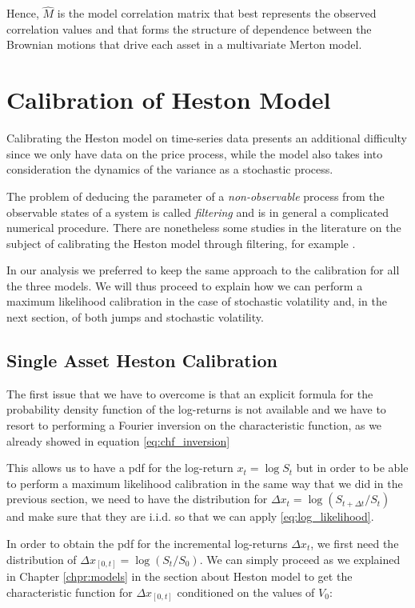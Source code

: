 Hence, $\widehat{M}$ is the model correlation matrix that best represents the observed correlation values and that forms the structure of dependence between the Brownian motions that drive each asset in a multivariate Merton model.


\bigskip
\section{Calibration of Heston Model}
\label{sec:heston_cal}
Calibrating the Heston model on time-series data presents an additional difficulty since we only have data on the price process, while the model also takes into consideration the dynamics of the variance as a stochastic process. 

The problem of deducing the parameter of a \textit{non-observable} process from the observable states of a system is called \textit{filtering} and is in general a complicated numerical procedure. There are nonetheless some studies in the literature on the subject of calibrating the Heston model through filtering, for example \citep{filtering}.

In our analysis we preferred to keep the same approach to the calibration for all the three models. We will thus proceed to explain how we can perform a maximum likelihood calibration in the case of stochastic volatility and, in the next section, of both jumps and stochastic volatility.

\subsection{Single Asset Heston Calibration}
The first issue that we have to overcome is that an explicit formula for the probability density function of the log-returns is not available and we have to resort to performing a Fourier inversion on the characteristic function, as we already showed in equation \eqref{eq:chf_inversion}

This allows us to have a \acrfull{pdf} for the log-return $x_t = \log S_t $ but in order to be able to perform a maximum likelihood calibration in the same way that we did in the  previous section, we need to have the distribution for $\Delta x_t = \log (S_{t + \Delta t} / S_t)$ and make sure that they are i.i.d. so that we can apply \eqref{eq:log_likelihood}.

In order to obtain the pdf for the incremental log-returns $\Delta x_t$, we first need the distribution of  $\Delta x_{[0, t] }= \log (S_t / S_0)$. We can simply proceed as we explained in Chapter \ref{chpr:models} in the section about Heston model to get the characteristic function for $\Delta x_{[0, t] }$ conditioned on the values of $V_0$: 

